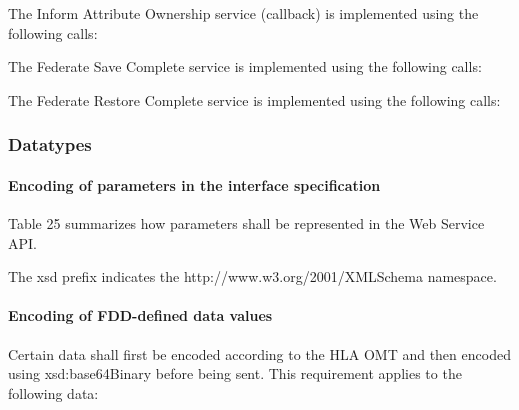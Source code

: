 \begin{compactstdpage}
    The Inform Attribute Ownership service (callback) is implemented using the following calls:

    The Federate Save Complete service is implemented using the following calls:

    The Federate Restore Complete service is implemented using the following calls:


    \subsubsection{Datatypes}

    \paragraph{Encoding of parameters in the interface specification}

    Table 25 summarizes how parameters shall be represented in the Web Service API.

    The xsd prefix indicates the http://www.w3.org/2001/XMLSchema namespace.

    \cxiitabletwentyfivea

\end{compactstdpage}

\clearpage

\begin{compactstdpage}
    \cxiitabletwentyfiveb

\end{compactstdpage}

\clearpage

\begin{compactstdpage}
    \cxiitabletwentyfivec

    \paragraph{Encoding of FDD-defined data values}

    Certain data shall first be encoded according to the HLA OMT and then encoded using xsd:base64Binary before being sent. This requirement applies to the following data:

\end{compactstdpage}

